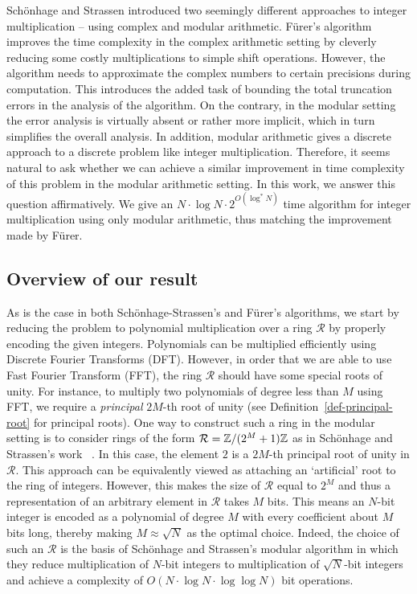 \documentclass[11pt]{article}
\begin{document}
Sch\"{o}nhage and Strassen introduced two seemingly different
approaches to integer multiplication -- using complex and modular
arithmetic. F\"{u}rer's algorithm improves the time complexity in the
complex arithmetic setting by cleverly reducing some costly
multiplications to simple shift operations. However, the algorithm
needs to approximate the complex numbers to certain precisions during
computation. This introduces the added task of bounding the total
truncation errors in the analysis of the algorithm. On the contrary,
in the modular setting the error analysis is virtually absent or
rather more implicit, which in turn simplifies the overall
analysis. In addition, modular arithmetic gives a discrete approach to
a discrete problem like integer multiplication. Therefore, it seems
natural to ask whether we can achieve a similar improvement in time
complexity of this problem in the modular arithmetic setting. In this
work, we answer this question affirmatively. We give an $N\cdot
\log{N}\cdot 2^{O(\log^{*}{N})}$ time algorithm for integer
multiplication using only modular arithmetic, thus matching the
improvement made by F\"{u}rer.

\subsection*{Overview of our result}

As is the case in both Sch\"{o}nhage-Strassen's and F\"{u}rer's
algorithms, we start by reducing the problem to polynomial
multiplication over a ring $\mathcal{R}$ by properly encoding the
given integers. Polynomials can be multiplied efficiently using
Discrete Fourier Transforms (DFT). However, in order that we are able
to use Fast Fourier Transform (FFT), the ring $\mathcal{R}$ should
have some special roots of unity. For instance, to multiply two
polynomials of degree less than $M$ using FFT, we require a
\emph{principal} $2M$-th root of unity (see
Definition~\ref{def-principal-root} for principal roots). One way to
construct such a ring in the modular setting is to consider rings of
the form $\mathcal{R} = \mathbb{Z}/(2^M + 1) \mathbb{Z}$ as in Sch\"{o}nhage and
Strassen's work ~\cite{SS71}. In this case, the element $2$ is a
$2M$-th principal root of unity in $\mathcal{R}$. This approach can be
equivalently viewed as attaching an `artificial' root to the ring of
integers. However, this makes the size of $\mathcal{R}$ equal to $2^M$
and thus a representation of an arbitrary element in $\mathcal{R}$
takes $M$ bits. This means an $N$-bit integer is encoded as a
polynomial of degree $M$ with every coefficient about $M$ bits long,
thereby making $M \approx \sqrt{N}$ as the optimal choice. Indeed, the
choice of such an $\mathcal{R}$ is the basis of Sch\"{o}nhage and
Strassen's modular algorithm in which they reduce multiplication of
$N$-bit integers to multiplication of $\sqrt{N}$-bit integers and
achieve a complexity of $O(N \cdot \log N \cdot \log \log N)$ bit
operations.
\end{document}
